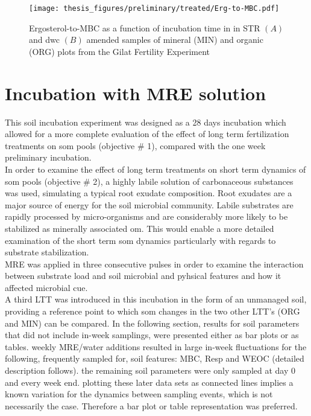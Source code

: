 \documentclass[12pt]{report}
\begin{document}
		\begin{figure}[H]
			\centering
			\texttt{[image: thesis\_figures/preliminary/treated/Erg-to-MBC.pdf]}
			\caption{Ergosterol-to-MBC  as a function of incubation time in in STR $\left(A\right)$ and \gls{dwc} $\left(B\right)$ amended samples of mineral (MIN) and organic (ORG) plots from the Gilat Fertility Experiment}
			\label{fig:erg_to_mbc_treated_preliminary}
		\end{figure}
		
		
		
		
		\section{Incubation with MRE solution}
		This soil incubation experiment was designed as a 28 days incubation which allowed for a more complete evaluation of the effect of long term fertilization treatments on \gls{som} pools (objective \# 1), compared with the one week  preliminary incubation.\\
		In order to examine the effect of long term treatments on short term dynamics of \gls{som} pools (objective \# 2), a highly labile solution of carbonaceous substances was used, simulating a typical root exudate composition. Root exudates are a major source of energy for the soil microbial community. Labile substrates are rapidly processed by micro-organisms and are considerably more likely to be stabilized as minerally associated \gls{om}. This would enable a more detailed examination of the short term \gls{som} dynamics particularly with regards to substrate stabilization. \\
		MRE was applied in three consecutive pulses in order to examine the interaction between substrate load and soil microbial and pyhsical features and how it affected microbial \gls{cue}. \\
		A third LTT was introduced in this incubation in the form of an unmanaged soil, providing a reference point to which \gls{som} changes in the two other LTT's (ORG and MIN) can be compared.
		In the following section, results for soil parameters that did not include in-week samplings, were presented either as bar plots  or as tables.	weekly MRE/water additions resulted in large in-week fluctuations for the following, frequently sampled for, soil features: MBC, Resp and WEOC (detailed description follows). the remaining soil parameters were only sampled at day 0 and every week end. plotting these later data sets as connected lines implies a known variation for the dynamics between sampling events, which is not necessarily the case. Therefore a bar plot or table representation was preferred.
		
\end{document}

